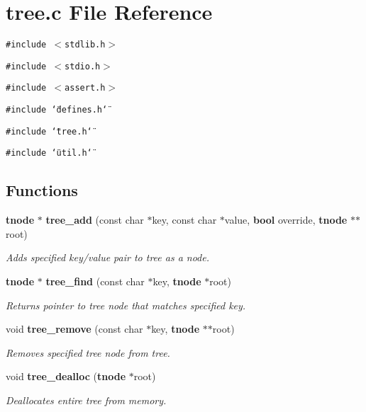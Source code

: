 \section{tree.c File Reference}
\label{tree_8c}
{\tt \#include $<$stdlib.h$>$}\par
{\tt \#include $<$stdio.h$>$}\par
{\tt \#include $<$assert.h$>$}\par
{\tt \#include \char`\"{}defines.h\char`\"{}}\par
{\tt \#include \char`\"{}tree.h\char`\"{}}\par
{\tt \#include \char`\"{}util.h\char`\"{}}\par
\subsection*{Functions}
\begin{CompactItemize}
\item 
{\bf tnode} $\ast$ {\bf tree\_\-add} (const char $\ast$key, const char $\ast$value, {\bf bool} override, {\bf tnode} $\ast$$\ast$root)
\begin{CompactList}\small\item\em Adds specified key/value pair to tree as a node. \item\end{CompactList}\item 
{\bf tnode} $\ast$ {\bf tree\_\-find} (const char $\ast$key, {\bf tnode} $\ast$root)
\begin{CompactList}\small\item\em Returns pointer to tree node that matches specified key. \item\end{CompactList}\item 
void {\bf tree\_\-remove} (const char $\ast$key, {\bf tnode} $\ast$$\ast$root)
\begin{CompactList}\small\item\em Removes specified tree node from tree. \item\end{CompactList}\item 
void {\bf tree\_\-dealloc} ({\bf tnode} $\ast$root)
\begin{CompactList}\small\item\em Deallocates entire tree from memory. \item\end{CompactList}\end{CompactItemize}



